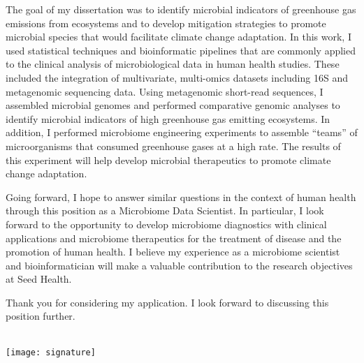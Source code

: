 \documentclass[11pt,letterpaper,sans]{moderncv}        %
\makeatletter
\renewcommand*{\makeletterclosing}{
  \@closing\\[3em]%
  \texttt{[image: signature]}\\%
  {\bfseries \@firstname~\@lastname}%
  \ifthenelse{\isundefined{\@enclosure}}{}{%
    \\%
    \vfill%
    {\color{color2}\itshape\enclname: \@enclosure}}}
\makeatother
\begin{document}
The goal of my dissertation was to identify microbial indicators of greenhouse
gas emissions from ecosystems and to develop mitigation strategies to promote
microbial species that would facilitate climate change adaptation. 
In this work, I used statistical techniques and bioinformatic
pipelines that are commonly applied to the clinical analysis of microbiological
data in human health studies. These included the integration of multivariate,
multi-omics datasets including 16S and metagenomic sequencing data. Using
metagenomic short-read sequences, I assembled microbial genomes and performed
comparative genomic analyses to identify microbial indicators of high
greenhouse gas emitting ecosystems. In addition, I performed microbiome engineering
experiments to assemble ``teams'' of microorganisms that consumed greenhouse
gases at a high rate. The results of this experiment will help develop
microbial therapeutics to promote climate change adaptation.

Going forward, I hope to answer similar questions in the context of human
health through this position as a Microbiome Data Scientist. In particular, I look
forward to the opportunity to develop microbiome diagnostics with clinical
applications and microbiome therapeutics for the treatment of disease and the
promotion of human health. I believe my experience as a microbiome scientist
and bioinformatician will make a valuable contribution to the research
objectives at Seed Health.

Thank you for considering my application. I look forward to discussing this
position further.


\makeletterclosing

\end{document}
